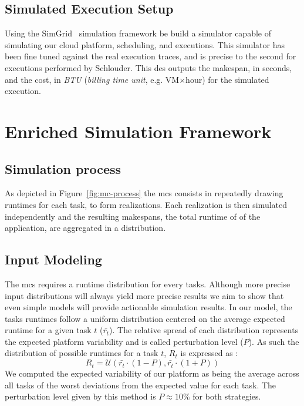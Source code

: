 \documentclass[10pt,conference,compsocconf]{IEEEtran}
\begin{document}
\subsection{Simulated Execution Setup}
Using the SimGrid~\cite{simgrid} simulation framework  be build a simulator
capable of simulating our cloud platform, scheduling, and executions. This
simulator has been fine tuned against the real execution traces, and is precise
to the second for executions performed by Schlouder. This \ac{des} outputs the
makespan, in seconds, and the cost, in \emph{BTU} (\emph{billing time unit},
e.g. VM$\times$hour) for the simulated execution.

\section{Enriched Simulation Framework}\label{sec:enriched-sim}

\subsection{Simulation process}


As depicted in Figure~\ref{fig:mc-process} the \ac{mcs} consists in repeatedly
drawing runtimes for each task, to form realizations. Each realization is then
simulated independently and the resulting makespans, the total runtime of of the
application, are aggregated in a distribution. 

\subsection{Input Modeling}\label{sec:im}
The \ac{mcs} requires a runtime distribution for every tasks. Although more
precise input distributions will always yield more precise results we aim to
show that even simple models will provide actionable simulation results. In our
model, the tasks runtimes follow a uniform distribution centered on the average
expected runtime for a given task $t$ ($\bar{r_t}$). The relative spread of each
distribution represents the expected platform variability and is called
perturbation level ($P$). As such the distribution of possible runtimes for a task
$t$,  $R_t$ is expressed as : 
\begin{equation}
	R_t=\mathcal{U}(\bar{r_t}\cdot{}(1-P), \bar{r_t}\cdot{}(1+P)) 
\end{equation}
We computed the expected variability of our platform as being the average across
all tasks of the worst deviations from the expected value for each task.  The
perturbation level given by this method is $P\approx{}10\%$ for both strategies.
\end{document}
